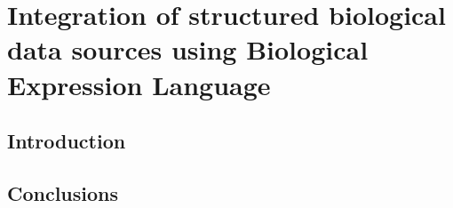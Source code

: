 \chapter{Integration of structured biological data sources using Biological Expression Language}\label{chap:bio2bel}

\section*{Introduction}

\vspace*{\fill}



\section*{Conclusions}
